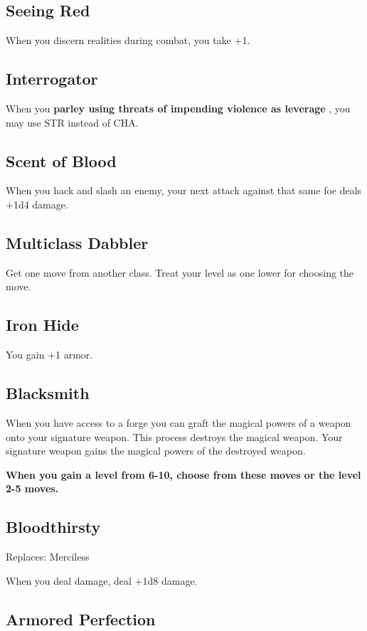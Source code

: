 \subsection{Seeing Red}

When you discern realities during combat, you take +1.
\subsection{Interrogator}

When you \textbf{parley using threats of impending violence as leverage}
, you may use STR instead of CHA.
\subsection{Scent of Blood}

When you hack and slash an enemy, your next attack against that same foe deals +1d4 damage.
\subsection{Multiclass Dabbler}

Get one move from another class. Treat your level as one lower for choosing the move.
\subsection{Iron Hide}

You gain +1 armor.
\subsection{Blacksmith}

When you have access to a forge you can graft the magical powers of a weapon onto your signature weapon. This process destroys the magical weapon. Your signature weapon gains the magical powers of the destroyed weapon.

\vspace{\baselineskip}
{\bfseries When you gain a level from 6-10, choose from these moves or the level 2-5 moves.}
\subsection{Bloodthirsty}

Replaces: Merciless

When you deal damage, deal +1d8 damage.
\subsection{Armored Perfection}


